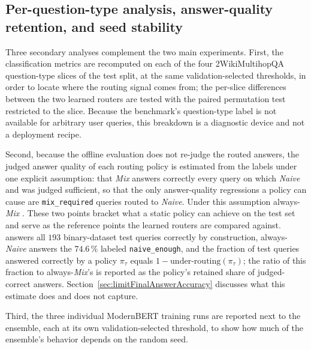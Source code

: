 \documentclass[english, bibtex]{kththesis}               %
\numberwithin{listing}{chapter}
\providecommand{\DIFaddtex}[1]{{\protect\color{blue} \sf #1}} %
\providecommand{\DIFdeltex}[1]{{\protect\color{red} \scriptsize #1}} %
\providecommand{\DIFaddbegin}{} %
\providecommand{\DIFaddend}{} %
\providecommand{\DIFdelbegin}{} %
\providecommand{\DIFdelend}{} %
\providecommand{\DIFadd}[1]{\texorpdfstring{\DIFaddtex{#1}}{#1}} %
\providecommand{\DIFdel}[1]{\texorpdfstring{\DIFdeltex{#1}}{}} %
\begin{document}
\subsection{Per-question-type analysis, answer-quality retention, and seed stability}
\label{sec:methodSecondary}

\DIFadd{Three secondary analyses complement the two main experiments. First, the classification metrics are recomputed on each of the four 2WikiMultihopQA question-type slices of the test split, at the same validation-selected thresholds, in order to locate where the routing signal comes from; the per-slice differences between the two learned routers are tested with the paired permutation test restricted to the slice. Because the benchmark's question-type label is not available for arbitrary user queries, this breakdown is a diagnostic device and not a deployment recipe.
}

\DIFadd{Second, because the offline evaluation does not re-judge the routed answers, the judged answer quality of each routing policy is estimated from the labels under one explicit assumption: that \emph{Mix} answers correctly every query on which }\DIFaddend \emph{Naive} \DIFdelbegin \DIFdel{and }\DIFdelend \DIFaddbegin \DIFadd{was judged sufficient, so that the only answer-quality regressions a policy can cause are \texttt{mix\_required} queries routed to \emph{Naive}. Under this assumption }\DIFaddend always-\emph{Mix} \DIFdelbegin \DIFdel{. These two points bracket what a static policy can achieve on the test set and serve as the reference points the learned routers are compared against. }\DIFdelend \DIFaddbegin \DIFadd{answers all $193$ binary-dataset test queries correctly by construction, always-\emph{Naive} answers the $74.6\,\%$ labeled \texttt{naive\_enough}, and the fraction of test queries answered correctly by a policy $\pi_\tau$ equals $1 - \mathrm{under\text{-}routing}(\pi_\tau)$; the ratio of this fraction to always-\emph{Mix}'s is reported as the policy's retained share of judged-correct answers. Section~\ref{sec:limitFinalAnswerAccuracy} discusses what this estimate does and does not capture.
}\DIFaddend 

\DIFdelbegin %
\DIFdelend \DIFaddbegin \DIFadd{Third, the three individual ModernBERT training runs are reported next to the ensemble, each at its own validation-selected threshold, to show how much of the ensemble's behavior depends on the random seed.
}\DIFaddend 
\end{document}
